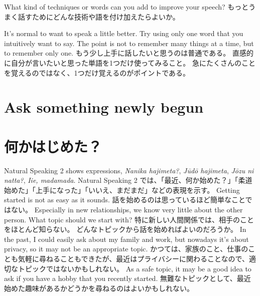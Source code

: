 \documentclass[uplatex,dvipdfmx,b5paper,english,10pt]{jsbook}
\begin{document}
\begin{toiquestion}
\ifEnglish
What kind of techniques or words can you add to improve your speech?
\else
もっとうまく話すためにどんな技術や語を付け加えたらよいか。
\fi
\end{toiquestion}

\begin{toianswer}
\ifEnglish
It's normal to want to speak a little better.
Try using only one word that you intuitively want to say.
The point is not to remember many things at a time, but to remember only one.
\else
もう少し上手に話したいと思うのは普通である。
直感的に自分が言いたいと思った単語を1つだけ使ってみること。
急にたくさんのことを覚えるのではなく、1つだけ覚えるのがポイントである。
\fi
\end{toianswer}

%
%

\ifEnglish
\section{Ask something newly begun}
\else
\section{何かはじめた？}
\fi

\ifEnglish
Natural Speaking 2 shows expressions, {\it Nanika hajimeta?\/}, {\it J\=ud\=o hajimeta\/}, {\it J\=ozu ni natta?\/}, {\it Iie, madamada\/}.
\else
Natural Speaking 2 では、「最近、何か始めた？」「柔道始めた」「上手になった」「いいえ、まだまだ」などの表現を示す。
\fi
\ifEnglish %
Getting started is not as easy as it sounds.
\else
話を始めるのは思っているほど簡単なことではない。
\fi
\ifEnglish
Especially in new relationships, we know very little about the other person.
What topic should we start with?
\else
特に新しい人間関係では、相手のことをほとんど知らない。
どんなトピックから話を始めればよいのだろうか。
\fi
\ifEnglish
In the past, I could easily ask about my family and work, but nowadays it's about privacy, so it may not be an appropriate topic.
\else
かつては、家族のこと、仕事のことも気軽に尋ねることもできたが、最近はプライバシーに関わることなので、適切なトピックではないかもしれない。
\fi
\ifEnglish
As a safe topic, it may be a good idea to ask if you have a hobby that you recently started.
\else
無難なトピックとして、最近始めた趣味があるかどうかを尋ねるのはよいかもしれない。
\fi
\end{document}
